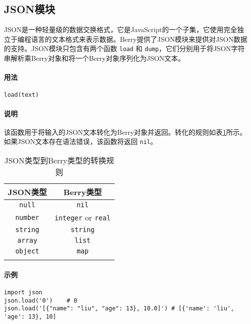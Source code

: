 \subsection{JSON模块}

JSON是一种轻量级的数据交换格式，它是JavaScript的一个子集，它使用完全独立于编程语言的文本格式来表示数据。Berry提供了JSON模块来提供对JSON数据的支持。JSON模块只包含有两个函数 \texttt{load} 和 \texttt{dump}，它们分别用于将JSON字符串解析乘Berry对象和将一个Berry对象序列化为JSON文本。


\paragraph{用法}
\begin{lstlisting}[language=berry, numbers=none]
load(text)
\end{lstlisting}

\paragraph{说明}
该函数用于将输入的JSON文本转化为Berry对象并返回。转化的规则如表\ref{tab::json2berry_rule}所示。如果JSON文本存在语法错误，该函数将返回 \texttt{nil}。
\begin{table}[htb]
    \centering
    \setlength{\tabcolsep}{18mm}
    \begin{tabular}{cc} \Xhline{1pt}
        \textbf{JSON类型} & \textbf{Berry类型} \\ \hline
        \texttt{null} & \texttt{nil} \\
        \texttt{number} & \texttt{integer} or \texttt{real} \\
        \texttt{string} & \texttt{string} \\
        \texttt{array} & \texttt{list} \\
        \texttt{object} & \texttt{map} \\
        \Xhline{1pt}
    \end{tabular}
    \caption{JSON类型到Berry类型的转换规则}
    \label{tab::json2berry_rule}
\end{table}

\paragraph{示例}
\begin{lstlisting}[language=berry, numbers=none]
import json
json.load('0')    # 0
json.load('[{"name": "liu", "age": 13}, 10.0]') # [{'name': 'liu', 'age': 13}, 10]
\end{lstlisting}

